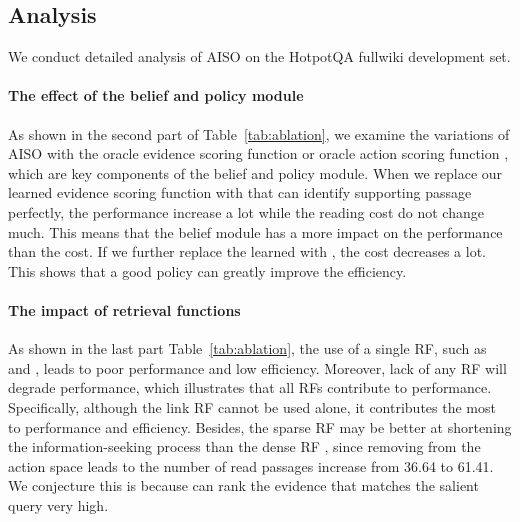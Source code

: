 \documentclass[11pt]{article}
\begin{document}
\subsection{Analysis}

\begin{table}
\centering
{}
\caption{Analysis experiments on HotpotQA fullwiki.}
\label{tab:ablation}
\end{table}

We conduct detailed analysis of AISO on the HotpotQA fullwiki development set. 

\paragraph{The effect of the belief and policy module}
As shown in the second part of Table~\ref{tab:ablation}, we examine the variations of AISO with the oracle evidence scoring function  or oracle action scoring function , which are key components of the belief and policy module.
When we replace our learned evidence scoring function with  that can identify supporting passage perfectly, the performance increase a lot while the reading cost do not change much.
This means that the belief module has a more impact on the performance than the cost. 
If we further replace the learned  with , the cost decreases a lot.
This shows that a good policy can greatly improve the efficiency.

\paragraph{The impact of retrieval functions}
As shown in the last part Table~\ref{tab:ablation}, the use of a single RF, such as  and , leads to poor performance and low efficiency.
Moreover, lack of any RF will degrade performance, which illustrates that all RFs contribute to performance.
Specifically, although the link RF  cannot be used alone, it contributes the most to performance and efficiency.
Besides, the sparse RF  may be better at shortening the information-seeking process than the dense RF , since removing  from the action space leads to the number of read passages increase from 36.64 to 61.41. 
We conjecture this is because  can rank the evidence that matches the salient query very high.
\end{document}
